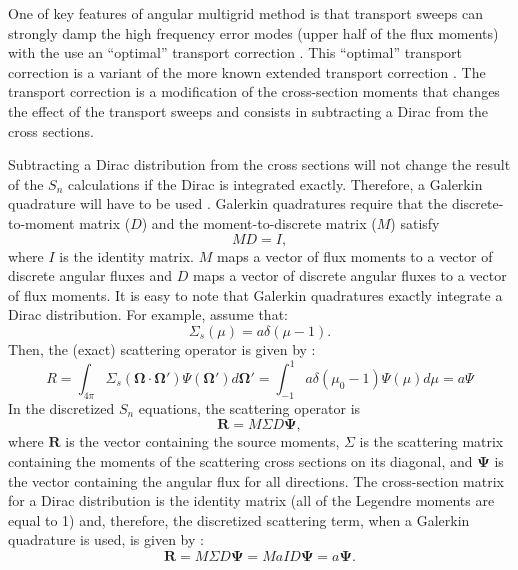 \documentclass[preprint,10pt]{elsarticle}
\newcommand\bo{\boldsymbol{\Omega}}
\newcommand\bs{\boldsymbol}
\renewcommand{\(}{\left(}
\renewcommand{\)}{\right)}
\renewcommand{\[}{\left[}
\renewcommand{\]}{\right]}
\begin{document}
One of key features of angular multigrid method is that transport sweeps
can strongly damp the high frequency error modes (upper half of the flux moments) with the
use an ``optimal'' transport correction \cite{multigrid_1d}. 
This ``optimal'' transport correction is a variant of the
more known extended transport correction \cite{lathrop,morel_79}. The transport
correction is a modification of the cross-section moments that changes the effect
of the transport sweeps and consists in subtracting a Dirac  from the cross
sections. 

Subtracting a Dirac distribution from the cross sections will not change the result of the $S_n$ 
calculations if the Dirac is integrated exactly. Therefore, a Galerkin quadrature
will have to be used \cite{galerkin_quad_morel89}. Galerkin quadratures require that the discrete-to-moment matrix ($D$)
and the moment-to-discrete matrix ($M$) satisfy
%
\begin{equation}
MD = I,
\end{equation}
%
where $I$ is the identity matrix. $M$ maps a vector of flux moments to a 
vector of discrete angular fluxes and $D$ maps a vector of discrete 
angular fluxes to a vector of flux moments. It is easy to note that Galerkin quadratures exactly 
integrate a Dirac distribution. For example, assume that:
%
\begin{equation}
\Sigma_s(\mu) = a\delta(\mu-1).
\end{equation}
%
Then, the (exact) scattering operator is given by :
%
\begin{equation}
R= \int_{4\pi} \Sigma_s(\bo\cdot\bo')\Psi(\bo')d\bo'
=\int_{-1}^1 a\delta(\mu_0-1)\Psi(\mu)d\mu
=a\Psi
\end{equation}
%
In the discretized $S_n$ equations, the scattering operator is
%
\begin{equation}
\bs{R} = M\Sigma D \bs{\Psi},
\end{equation}
%
where $\bs{R}$ is the vector containing the source moments, $\Sigma$ is the scattering
matrix containing the moments of the scattering cross sections on its
diagonal, and $\bs{\Psi}$ is the vector containing the angular flux for all directions.
The cross-section matrix for a Dirac distribution is the identity matrix 
(all of the Legendre moments are equal to 1) and,
therefore, the discretized scattering term, when a Galerkin quadrature is used, is given by :
%
\begin{equation}
\bs{R} = M\Sigma D \bs{\Psi} = M aI D \bs{\Psi} =a\bs{\Psi} .
\end{equation}
%
\end{document}
